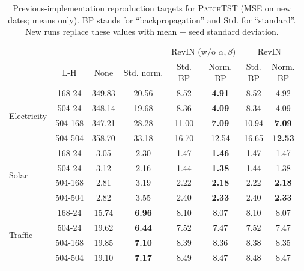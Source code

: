 \begin{table}[t]
\caption{Previous-implementation reproduction targets for \textsc{PatchTST}
(MSE on new dates; means only). BP stands for ``backpropagation'' and Std. for
``standard''. New runs replace these values with mean $\pm$ seed standard
deviation.}
\centering
\setlength{\tabcolsep}{1.5pt}
\begin{tabular}{lccccccc}
\toprule
& & & & \multicolumn{2}{c}{RevIN (w/o $\alpha,\beta$)} & \multicolumn{2}{c}{RevIN} \\
     \cmidrule(r){5-6} \cmidrule(r){7-8}
 & L-H & None & Std. norm. & \thead{Std.\\BP} & \thead{Norm.\\BP} & \thead{Std.\\BP} & \thead{Norm.\\BP} \\
\midrule
\multirow{4}{*}{Electricity} & 168-24 & 349.83 & 20.56 & 8.52 & \textbf{4.91} & 8.52 & 4.92 \\
 & 504-24 & 348.14 & 19.68 & 8.36 & \textbf{4.09} & 8.34 & 4.09 \\
 & 504-168 & 347.21 & 28.28 & 11.00 & \textbf{7.09} & 10.94 & \textbf{7.09} \\
 & 504-504 & 358.70 & 33.18 & 16.70 & 12.54 & 16.65 & \textbf{12.53} \\
\midrule
\multirow{4}{*}{Solar} & 168-24 & 3.05 & 2.30 & 1.47 & \textbf{1.46} & 1.47 & 1.47 \\
 & 504-24 & 3.12 & 2.16 & 1.44 & \textbf{1.38} & 1.44 & 1.38 \\
 & 504-168 & 2.81 & 3.19 & 2.22 & \textbf{2.18} & 2.22 & \textbf{2.18} \\
 & 504-504 & 2.82 & 3.55 & 2.40 & \textbf{2.33} & 2.40 & \textbf{2.33} \\
\midrule
\multirow{4}{*}{Traffic} & 168-24 & 15.74 & \textbf{6.96} & 8.10 & 8.07 & 8.10 & 8.07 \\
 & 504-24 & 19.62 & \textbf{6.44} & 7.52 & 7.47 & 7.52 & 7.47 \\
 & 504-168 & 19.85 & \textbf{7.10} & 8.39 & 8.36 & 8.38 & 8.35 \\
 & 504-504 & 19.10 & \textbf{7.17} & 8.49 & 8.47 & 8.48 & 8.47 \\
\bottomrule
\end{tabular}
\label{tab:main1}
\end{table}

